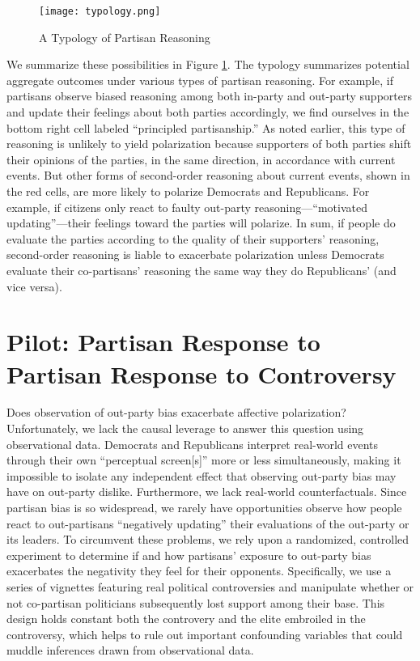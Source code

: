 \documentclass[12pt, letterpaper]{article}
\begin{document}
\begin{figure}
\caption{A Typology of Partisan Reasoning} \label{fig:typology}
\begin{center}
\texttt{[image: typology.png]}
\end{center}
\end{figure}

We summarize these possibilities in Figure \ref{fig:typology}. The typology summarizes potential aggregate outcomes under various types of partisan reasoning. For example, if partisans observe biased reasoning among both in-party and out-party supporters and update their feelings about both parties accordingly, we find ourselves in the bottom right cell labeled ``principled partisanship.'' As noted earlier, this type of reasoning is unlikely to yield polarization because supporters of both parties shift their opinions of the parties, in the same direction, in accordance with current events. But other forms of second-order reasoning about current events, shown in the red cells, are more likely to polarize Democrats and Republicans. For example, if citizens only react to faulty out-party reasoning---``motivated updating''---their feelings toward the parties will polarize. In sum, if people do evaluate the parties according to the quality of their supporters' reasoning, second-order reasoning is liable to exacerbate polarization unless Democrats evaluate their co-partisans' reasoning the same way they do Republicans' (and vice versa).


\section*{Pilot: Partisan Response to Partisan Response to Controversy}

Does observation of out-party bias exacerbate affective polarization? Unfortunately, we lack the causal leverage to answer this question using observational data. Democrats and Republicans interpret real-world events through their own ``perceptual screen[s]'' \citep{campbell1960} more or less simultaneously, making it impossible to isolate any independent effect that observing out-party bias may have on out-party dislike. Furthermore, we lack real-world counterfactuals. Since partisan bias is so widespread, we rarely have opportunities observe how people react to out-partisans ``negatively updating'' their evaluations of the out-party or its leaders. To circumvent these problems, we rely upon a randomized, controlled experiment to determine if and how partisans' exposure to out-party bias exacerbates the negativity they feel for their opponents. Specifically, we use a series of vignettes featuring real political controversies and manipulate whether or not co-partisan politicians subsequently lost support among their base. This design holds constant both the controvery and the elite embroiled in the controversy, which helps to rule out important confounding variables that could muddle inferences drawn from observational data. 
\end{document}
